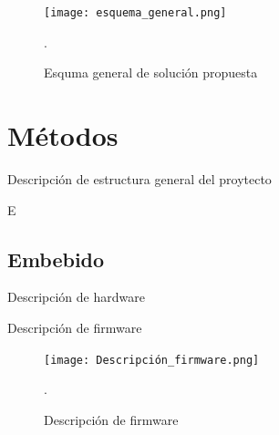 \documentclass[journal]{IEEEtran}
\begin{document}





\begin{figure}[!h]
	\centering
	\texttt{[image: esquema\_general.png]}
	\caption{Esquma general de solución propuesta}.
	\label{hardware}
\end{figure}


\section{Métodos}

Descripción de estructura general del proytecto
\newline 

{\color{blue}E}

\subsection{Embebido}

Descripción de hardware

Descripción de firmware 


\begin{figure}[!h]
	\centering
	\texttt{[image: Descripción\_firmware.png]}
	\caption{Descripción de firmware}.
	\label{estructura_general}
\end{figure}
\end{document}
